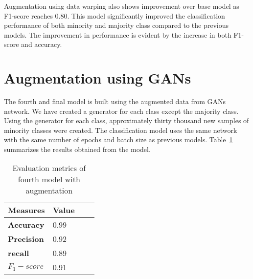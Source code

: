 Augmentation using data warping also shows improvement over base model as F1-score reaches 0.80. This model significantly improved the classification performance of both minority and majority class compared to the previous models. The improvement in performance is evident by the increase in both F1-score and accuracy. 

\section{Augmentation using GANs}  
The fourth and final model is built using the augmented data from GANs network. We have created a generator for each class except the majority class. Using the generator for each class, approximately thirty thousand new samples of minority classes were created. The classification model uses the same network with the same number of epochs and batch size as previous models. Table~\ref{table:model4_result} summarizes the results obtained from the model.

\begin{table}[ht]
	\centering
	\caption{Evaluation metrics of fourth model with augmentation}
	\label{table:model4_result}
	\begin{tabular}{|p{2cm}|p{2cm}|p{2cm}|p{2cm}|} 
		\hline
		\textbf{Measures} & \textbf{Value}\\ 
		\hline %
		\textbf{Accuracy} & 0.99  \\ 
		\textbf{Precision} & 0.92  \\ 
		
		\textbf{recall} & 0.89 \\ 
		
		\textbf{\textbf{$F_1-score$}} & 0.91 \\ 
		
		\hline		
	\end{tabular} %
	
\end{table} %

